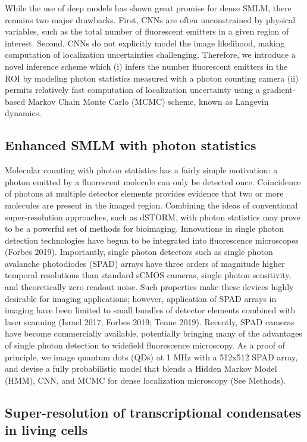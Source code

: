 \documentclass{ucetd}
\begin{document}
While the use of deep models has shown great promise for dense SMLM, there remains two major drawbacks. First, CNNs are often unconstrained by physical variables, such as the total number of fluorescent emitters in a given region of interest. Second, CNNs do not explicitly model the image likelihood, making computation of localization uncertainties challenging. Therefore, we introduce a novel inference scheme which (i) infers the number fluorescent emitters in the ROI by modeling photon statistics measured with a photon counting camera (ii) permits relatively fast computation of localization uncertainty using a gradient-based Markov Chain Monte Carlo (MCMC) scheme, known as Langevin dynamics.

\subsection{Enhanced SMLM with photon statistics}

Molecular counting with photon statistics has a fairly simple motivation: a photon emitted by a fluorescent molecule can only be detected once. Coincidence of photons at multiple detector elements provides evidence that two or more molecules are present in the imaged region. Combining the ideas of conventional super-resolution approaches, such as dSTORM, with photon statistics may prove to be a powerful set of methods for bioimaging. Innovations in single photon detection technologies have begun to be integrated into fluorescence microscopes (Forbes 2019). Importantly, single photon detectors such as single photon avalanche photodiodes (SPAD) arrays have three orders of magnitude higher temporal resolutions than standard sCMOS cameras, single photon sensitivity, and theoretically zero readout noise. Such properties make these devices highly desirable for imaging applications; however, application of SPAD arrays in imaging have been limited to small bundles of detector elements combined with laser scanning (Israel 2017; Forbes 2019; Tenne 2019). Recently, SPAD cameras have become commercially available, potentially bringing many of the advantages of single photon detection to widefield fluorescence microscopy. As a proof of principle, we image quantum dots (QDs) at 1 MHz with a 512x512 SPAD array, and devise a fully probabilistic model that blends a Hidden Markov Model (HMM), CNN, and MCMC for dense localization microscopy (See Methods).


\subsection{Super-resolution of transcriptional condensates in living cells}
\end{document}

